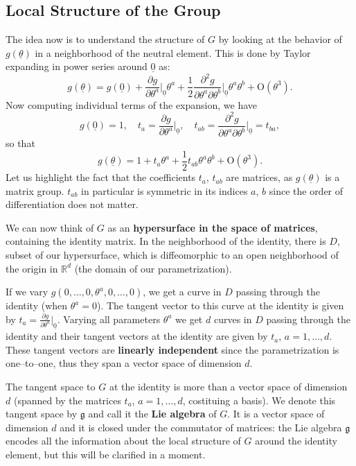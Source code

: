 \subsection{Local Structure of the Group}

The idea now is to understand the structure of \(G\) by looking at the behavior of \(g(\underline{\theta})\) in a neighborhood of the neutral element. This is done by Taylor expanding in power series around \(\underline{0}\) as:
\[
    g(\underline{\theta}) = g(\underline{0}) + \frac{\partial g}{\partial \theta^a} \bigg|_{\underline{0}} \theta^a + \frac{1}{2} \frac{\partial^2 g}{\partial \theta^a \partial \theta^b} \bigg|_{\underline{0}} \theta^a \theta^b + \mathrm{O}(\theta^3).
\]
Now computing individual terms of the expansion, we have
\[
    g(\underline{0}) = 1, \quad t_a = \frac{\partial g}{\partial \theta^a} \bigg|_{\underline{0}}, \quad t_{ab} = \frac{\partial^2 g}{\partial \theta^a \partial \theta^b} \bigg|_{\underline{0}} = t_{ba},
\]
so that
\begin{equation}
    g(\underline{\theta}) = 1 + t_a \theta^a + \frac{1}{2} t_{ab} \theta^a \theta^b + \mathrm{O}(\theta^3).
    \label{eq:lie_parametrization_taylor_expansion}
\end{equation}
Let us highlight the fact that the coefficients \(t_a\), \(t_{ab}\) are matrices, as \(g(\underline{\theta})\) is a matrix group. \(t_{ab}\) in particular is symmetric in its indices \(a\), \(b\) since the order of differentiation does not matter.

We can now think of \(G\) as an \textbf{hypersurface in the space of matrices}, containing the identity matrix. In the neighborhood of the identity, there is \(D\), subset of our hypersurface, which is diffeomorphic to an open neighborhood of the origin in \(\mathbb{R}^d\) (the domain of our parametrization).

If we vary \(g(0,\dots,0,\theta^a,0,\dots,0)\), we get a curve in \(D\) passing through the identity (when \(\theta^a = 0\)). The tangent vector to this curve at the identity is given by \(t_a = \frac{\partial g}{\partial \theta^a} \big|_{\underline{0}}\). Varying all parameters \(\theta^a\) we get \(d\) curves in \(D\) passing through the identity and their tangent vectors at the identity are given by \(t_a\), \(a = 1, \ldots, d\). These tangent vectors are \textbf{linearly independent} since the parametrization is one–to–one, thus they span a vector space of dimension \(d\).

The tangent space to \(G\) at the identity is more than a vector space of dimension \(d\) (spanned by the matrices \(t_a\), \(a = 1, \ldots, d\), costituing a basis). We denote this tangent space by \(\mathfrak{g}\) and call it the \textbf{Lie algebra} of \(G\). It is a vector space of dimension \(d\) and it is closed under the commutator of matrices: the Lie algebra \(\mathfrak{g}\) encodes all the information about the local structure of \(G\) around the identity element, but this will be clarified in a moment.

